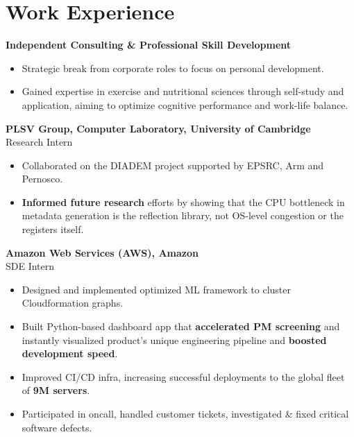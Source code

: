 \documentclass[11pt,a4paper]{article}
\newcommand{\years}[1]{\marginnote{\footnotesize\myfont #1}} %
\begin{document}
\section{Work Experience}
\years{2023-24} \textbf{Independent Consulting \& Professional Skill Development} \vspace{1pt}
    \begin{itemize}[itemsep=-1.5mm,topsep=0pt,partopsep=0pt,leftmargin=5mm]
    \item Strategic break from corporate roles to focus on personal development.
    \item Gained expertise in exercise and nutritional sciences through self-study and application, aiming to optimize cognitive performance and work-life balance. \medskip
    \end{itemize}
\years{2023-23} \textbf{PLSV Group, Computer Laboratory, University of Cambridge} \\
    Research Intern \vspace{1pt}
    \begin{itemize}[itemsep=-1mm,topsep=0pt,partopsep=0pt,leftmargin=5mm]
    \item Collaborated on the DIADEM project supported by EPSRC, Arm and Pernosco.
    \item \textbf{Informed future research} efforts by showing that the CPU bottleneck in metadata generation is the reflection library, not OS-level congestion or the registers itself. \medskip
    \end{itemize}
    \years{2022-22} \textbf{Amazon Web Services (AWS), Amazon} \\
    SDE Intern \vspace{1pt}
    \begin{itemize}[itemsep=-1mm,topsep=0pt,partopsep=0pt,leftmargin=5mm]
     \item Designed and implemented optimized ML framework to cluster Cloudformation graphs.
     \item Built Python-based dashboard app that \textbf{accelerated PM screening} and instantly visualized product’s unique engineering pipeline and \textbf{boosted development speed}.
     \item Improved CI/CD infra, increasing successful deployments to the global fleet of \textbf{9M servers}.
     \item Participated in oncall, handled customer tickets, investigated \& fixed critical software defects.\medskip
    \end{itemize}
\end{document}
